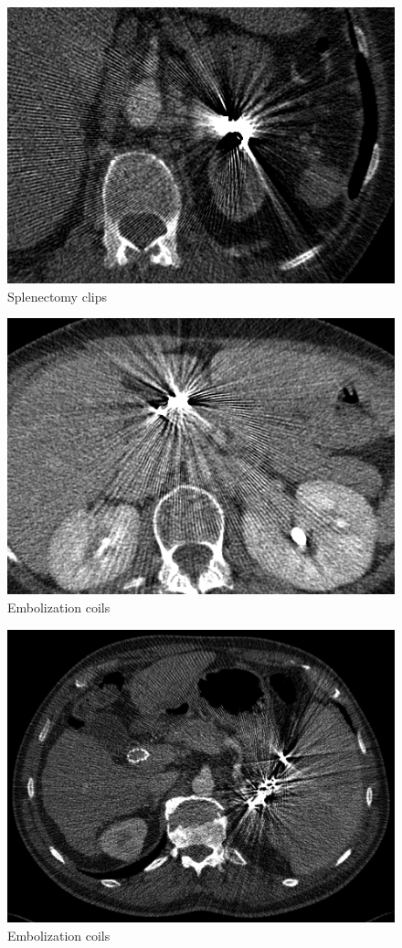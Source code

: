 \begin{figure}[h!]
	\centering
	\includegraphics[width=0.5\linewidth]{images/01_FBP.png}
	\caption{Splenectomy clips\cite{revisionrads}}
\end{figure}
\begin{figure}[h!]
	\centering
	\includegraphics[width=0.5\linewidth]{images/03_FBP.png}
	\caption{Embolization coils\cite{revisionrads}}
\end{figure}
\begin{figure}[h!]
	\centering
	\includegraphics[width=0.5\linewidth]{images/04_FBP.png}
	\caption{Embolization coils\cite{revisionrads}}
\end{figure}